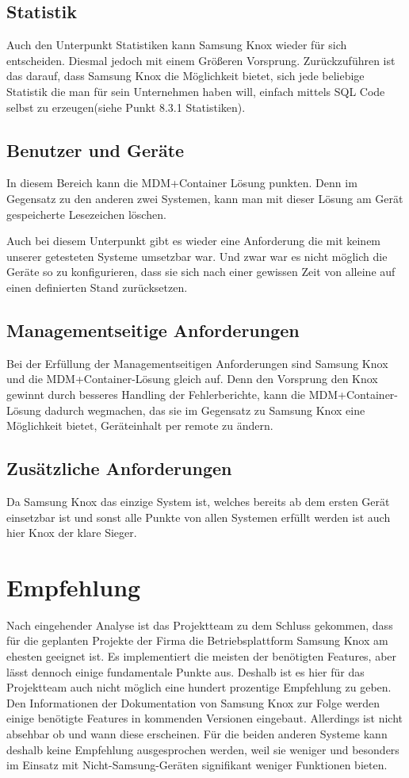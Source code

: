 \subsection{Statistik}
Auch den Unterpunkt Statistiken kann Samsung Knox wieder für sich entscheiden. Diesmal jedoch mit einem Größeren Vorsprung. Zurückzuführen ist das darauf, dass Samsung Knox die Möglichkeit bietet, sich jede beliebige Statistik die man für sein Unternehmen haben will, einfach mittels SQL Code selbst zu erzeugen(siehe Punkt 8.3.1 Statistiken).
\subsection{Benutzer und Geräte}
In diesem Bereich kann die MDM+Container Lösung punkten. Denn im Gegensatz zu den anderen zwei Systemen, kann man mit dieser Lösung am Gerät gespeicherte Lesezeichen löschen. \par
Auch bei diesem Unterpunkt gibt es wieder eine Anforderung die mit keinem unserer getesteten Systeme umsetzbar war. Und zwar war es nicht möglich die Geräte so zu konfigurieren, dass sie sich nach einer gewissen Zeit von alleine auf einen definierten Stand zurücksetzen.
\subsection{Managementseitige Anforderungen}
Bei der Erfüllung der Managementseitigen Anforderungen sind Samsung Knox und die MDM+Container-Lösung gleich auf. Denn den Vorsprung den Knox gewinnt durch besseres Handling der Fehlerberichte, kann die MDM+Container-Lösung dadurch wegmachen, das sie im Gegensatz zu Samsung Knox eine Möglichkeit bietet, Geräteinhalt per remote zu ändern.
\subsection{Zusätzliche Anforderungen}
Da Samsung Knox das einzige System ist, welches bereits ab dem ersten Gerät einsetzbar ist und sonst alle Punkte von allen Systemen erfüllt werden ist auch hier Knox der klare Sieger.

\section{Empfehlung}
Nach eingehender Analyse ist das Projektteam zu dem Schluss gekommen, dass für die geplanten Projekte der Firma die Betriebsplattform Samsung Knox am ehesten geeignet ist. Es implementiert die meisten der benötigten Features, aber lässt dennoch einige fundamentale Punkte aus. Deshalb ist es hier für das Projektteam auch nicht möglich eine hundert prozentige Empfehlung zu geben. Den Informationen der Dokumentation von Samsung Knox zur Folge werden einige benötigte Features in kommenden Versionen eingebaut. Allerdings ist nicht absehbar ob und wann diese erscheinen. Für die beiden anderen Systeme kann deshalb keine Empfehlung ausgesprochen werden, weil sie weniger und besonders im Einsatz mit Nicht-Samsung-Geräten signifikant weniger Funktionen bieten.

